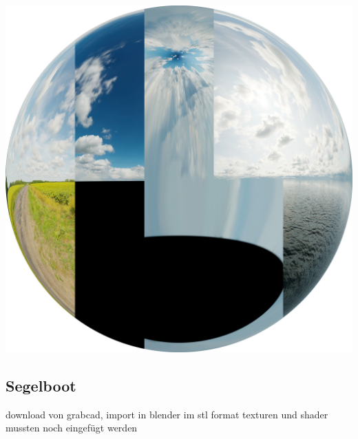 \includegraphics[width=\textwidth]{gfx/prod/env/env.jpg}


\subsection{Segelboot}

download von grabcad, import in blender im stl format
texturen und shader mussten noch eingefügt werden

